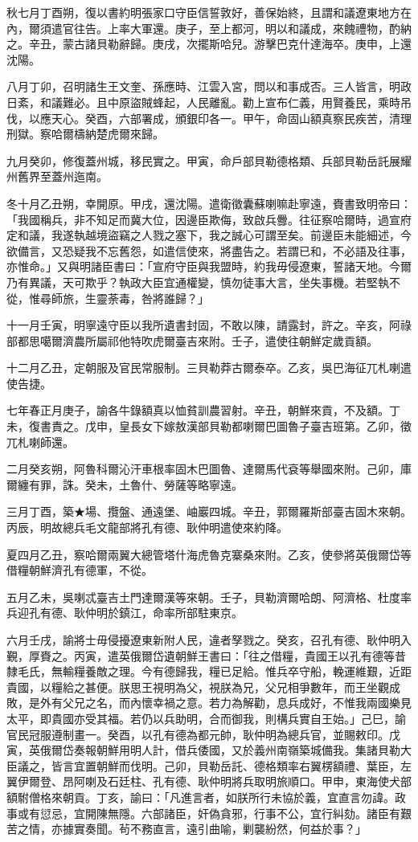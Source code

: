 \begin{pinyinscope}
秋七月丁酉朔，復以書約明張家口守臣信誓敦好，善保始終，且謂和議遼東地方在內，爾須遣官往告。上率大軍還。庚子，至上都河，明以和議成，來餽禮物，酌納之。辛丑，蒙古諸貝勒辭歸。庚戌，次擺斯哈兒。游擊巴克什達海卒。庚申，上還沈陽。

八月丁卯，召明諸生王文奎、孫應時、江雲入宮，問以和事成否。三人皆言，明政日紊，和議難必。且中原盜賊蜂起，人民離亂。勸上宣布仁義，用賢養民，乘時吊伐，以應天心。癸酉，六部署成，頒銀印各一。甲午，命固山額真察民疾苦，清理刑獄。察哈爾檮納楚虎爾來歸。

九月癸卯，修復蓋州城，移民實之。甲寅，命戶部貝勒德格類、兵部貝勒岳託展耀州舊界至蓋州迤南。

冬十月乙丑朔，幸開原。甲戌，還沈陽。遣衛徵囊蘇喇嘛赴寧遠，賚書致明帝曰：「我國稱兵，非不知足而冀大位，因邊臣欺侮，致啟兵釁。往征察哈爾時，過宣府定和議，我遂執越境盜竊之人戮之塞下，我之誠心可謂至矣。前邊臣未能細述，今欲備言，又恐疑我不忘舊怨，如遣信使來，將盡告之。若謂已和，不必語及往事，亦惟命。」又與明諸臣書曰：「宣府守臣與我盟時，約我毋侵遼東，誓諸天地。今爾乃有異議，天可欺乎？執政大臣宜通權變，慎勿徒事大言，坐失事機。若堅執不從，惟尋師旅，生靈荼毒，咎將誰歸？」

十一月壬寅，明寧遠守臣以我所遺書封固，不敢以陳，請露封，許之。辛亥，阿祿部都思噶爾濟農所屬祁他特吹虎爾臺吉來附。壬子，遣使往朝鮮定歲貢額。

十二月乙丑，定朝服及官民常服制。三貝勒莽古爾泰卒。乙亥，吳巴海征兀札喇遣使告捷。

七年春正月庚子，諭各牛錄額真以恤貧訓農習射。辛丑，朝鮮來貢，不及額。丁未，復書責之。戊申，皇長女下嫁敖漢部貝勒都喇爾巴圖魯子臺吉班第。乙卯，徵兀札喇師還。

二月癸亥朔，阿魯科爾沁汗車根率固木巴圖魯、達爾馬代袞等舉國來附。己卯，庫爾纏有罪，誅。癸未，土魯什、勞薩等略寧遠。

三月丁酉，築★場、攬盤、通遠堡、岫巖四城。辛丑，郭爾羅斯部臺吉固木來朝。丙辰，明故總兵毛文龍部將孔有德、耿仲明遣使來約降。

夏四月乙丑，察哈爾兩翼大總管塔什海虎魯克寨桑來附。乙亥，使參將英俄爾岱等借糧朝鮮濟孔有德軍，不從。

五月乙未，吳喇忒臺吉土門達爾漢等來朝。壬子，貝勒濟爾哈朗、阿濟格、杜度率兵迎孔有德、耿仲明於鎮江，命率所部駐東京。

六月壬戌，諭將士毋侵擾遼東新附人民，違者孥戮之。癸亥，召孔有德、耿仲明入覲，厚賚之。丙寅，遣英俄爾岱遺朝鮮王書曰：「往之借糧，貴國王以孔有德等昔隸毛氏，無輸糧養敵之理。今有德歸我，糧已足給。惟兵卒守船，輓運維艱，近距貴國，以糧給之甚便。朕思王視明為父，視朕為兄，父兄相爭數年，而王坐觀成敗，是外有父兄之名，而內懷幸禍之意。若力為解勸，息兵成好，不惟我兩國樂見太平，即貴國亦受其福。若仍以兵助明，合而御我，則構兵實自王始。」己巳，諭官民冠服遵制畫一。癸酉，以孔有德為都元帥，耿仲明為總兵官，並賜敕印。戊寅，英俄爾岱奏報朝鮮用明人計，借兵倭國，又於義州南嶺築城備我。集諸貝勒大臣議之，皆言宜置朝鮮而伐明。己卯，貝勒岳託、德格類率右翼楞額禮、葉臣，左翼伊爾登、昂阿喇及石廷柱、孔有德、耿仲明將兵取明旅順口。甲申，東海使犬部額駙僧格來朝貢。丁亥，諭曰：「凡進言者，如朕所行未協於義，宜直言勿諱。政事或有愆忌，宜開陳無隱。六部諸臣，奸偽貪邪，行事不公，宜行糾劾。諸臣有艱苦之情，亦據實奏聞。茍不務直言，遠引曲喻，剿襲紛然，何益於事？」


\end{pinyinscope}
